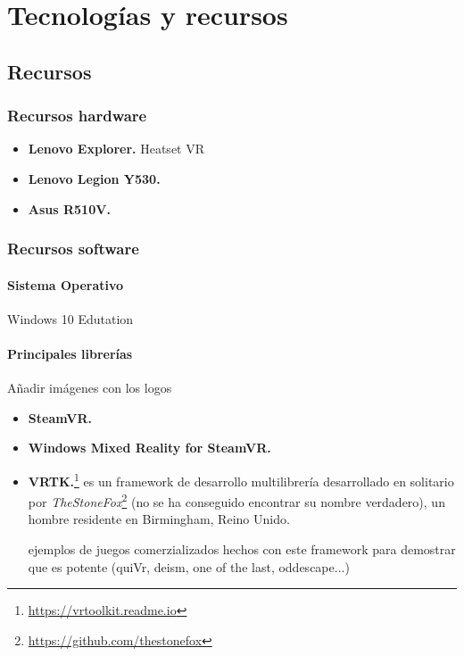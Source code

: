 \chapter{Tecnologías y recursos}
\label{chap:tecnologia}

\section{Recursos}

\subsection{Recursos hardware}

\begin{itemize}
 \item \textbf{Lenovo Explorer.} Heatset VR
 \item \textbf{Lenovo Legion Y530.}
 \item \textbf{Asus R510V.}
\end{itemize}

\subsection{Recursos software}

\subsubsection{Sistema Operativo}

Windows 10 Edutation 

\subsubsection{Principales librerías}

Añadir imágenes con los logos

\begin{itemize}
    \item \textbf{SteamVR.}
    \item \textbf{Windows Mixed Reality for SteamVR.}
    \item \textbf{VRTK.}\footnote{\url{https://vrtoolkit.readme.io}} es un framework de desarrollo multilibrería desarrollado en solitario por \textit{TheStoneFox}\footnote{\url{https://github.com/thestonefox}} (no se ha conseguido encontrar su nombre verdadero), un hombre residente en Birmingham, Reino Unido.
    
    ejemplos de juegos comerzializados hechos  con este framework para demostrar que es potente (quiVr, deism, one of the last, oddescape...)
\end{itemize}

